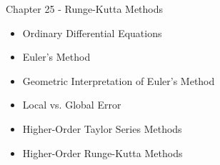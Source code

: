 \documentclass[12pt]{beamer}
\begin{document}
\begin{frame}{Chapter 25 - Runge-Kutta Methods}

\begin{itemize}

\item{Ordinary Differential Equations}

\item{Euler's Method}

\item{Geometric Interpretation of Euler's Method}

\item{Local vs. Global Error}

\item{Higher-Order Taylor Series Methods}

\item{Higher-Order Runge-Kutta Methods}

\end{itemize}

\end{frame}
\end{document}
